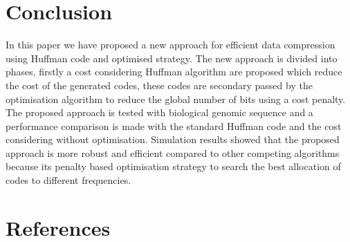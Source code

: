 \documentclass[preprint,12pt]{elsarticle}
\begin{document}
\section{Conclusion}
\label{sec5}
In this paper we have proposed a new approach for efficient data compression using Huffman code and optimised strategy. The new approach is divided into phases, firstly a cost considering Huffman algorithm are proposed which reduce the cost of the generated codes, these codes are secondary passed by the optimisation algorithm to reduce the global number of bits using a cost penalty.\\
The proposed approach is tested with biological genomic sequence and a performance comparison is made with the standard Huffman code and the cost considering without optimisation. Simulation results showed that the proposed approach is more robust and efficient compared to other competing algorithms because its penalty based optimisation strategy to search the best allocation of codes to different frequencies.








\section*{References}

\end{document}
